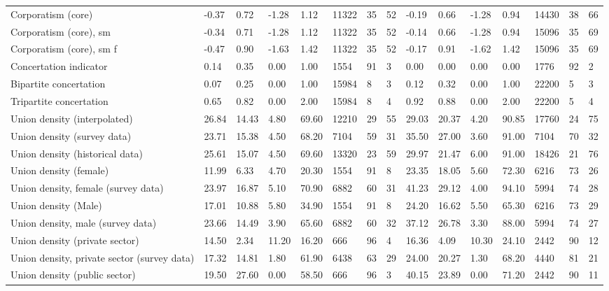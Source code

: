\begin{longtable}{lllllllllllllll}
Corporatism (core) & -0.37 & 0.72 & -1.28 & 1.12 & 11322 & 35 & 52 & -0.19 & 0.66 & -1.28 & 0.94 & 14430 & 38 & 66\\
\addlinespace
Corporatism (core), sm & -0.34 & 0.71 & -1.28 & 1.12 & 11322 & 35 & 52 & -0.14 & 0.66 & -1.28 & 0.94 & 15096 & 35 & 69\\
Corporatism (core), sm f & -0.47 & 0.90 & -1.63 & 1.42 & 11322 & 35 & 52 & -0.17 & 0.91 & -1.62 & 1.42 & 15096 & 35 & 69\\
Concertation indicator & 0.14 & 0.35 & 0.00 & 1.00 & 1554 & 91 & 3 & 0.00 & 0.00 & 0.00 & 0.00 & 1776 & 92 & 2\\
Bipartite concertation & 0.07 & 0.25 & 0.00 & 1.00 & 15984 & 8 & 3 & 0.12 & 0.32 & 0.00 & 1.00 & 22200 & 5 & 3\\
Tripartite concertation & 0.65 & 0.82 & 0.00 & 2.00 & 15984 & 8 & 4 & 0.92 & 0.88 & 0.00 & 2.00 & 22200 & 5 & 4\\
\addlinespace
Union density (interpolated) & 26.84 & 14.43 & 4.80 & 69.60 & 12210 & 29 & 55 & 29.03 & 20.37 & 4.20 & 90.85 & 17760 & 24 & 75\\
Union density (survey data) & 23.71 & 15.38 & 4.50 & 68.20 & 7104 & 59 & 31 & 35.50 & 27.00 & 3.60 & 91.00 & 7104 & 70 & 32\\
Union density (historical data) & 25.61 & 15.07 & 4.50 & 69.60 & 13320 & 23 & 59 & 29.97 & 21.47 & 6.00 & 91.00 & 18426 & 21 & 76\\
Union density (female) & 11.99 & 6.33 & 4.70 & 20.30 & 1554 & 91 & 8 & 23.35 & 18.05 & 5.60 & 72.30 & 6216 & 73 & 26\\
Union density, female (survey data) & 23.97 & 16.87 & 5.10 & 70.90 & 6882 & 60 & 31 & 41.23 & 29.12 & 4.00 & 94.10 & 5994 & 74 & 28\\
\addlinespace
Union density (Male) & 17.01 & 10.88 & 5.80 & 34.90 & 1554 & 91 & 8 & 24.20 & 16.62 & 5.50 & 65.30 & 6216 & 73 & 29\\
Union density, male (survey data) & 23.66 & 14.49 & 3.90 & 65.60 & 6882 & 60 & 32 & 37.12 & 26.78 & 3.30 & 88.00 & 5994 & 74 & 27\\
Union density (private sector) & 14.50 & 2.34 & 11.20 & 16.20 & 666 & 96 & 4 & 16.36 & 4.09 & 10.30 & 24.10 & 2442 & 90 & 12\\
Union density, private sector (survey data) & 17.32 & 14.81 & 1.80 & 61.90 & 6438 & 63 & 29 & 24.00 & 20.27 & 1.30 & 68.20 & 4440 & 81 & 21\\
Union density (public sector) & 19.50 & 27.60 & 0.00 & 58.50 & 666 & 96 & 3 & 40.15 & 23.89 & 0.00 & 71.20 & 2442 & 90 & 11\\

\end{longtable}
